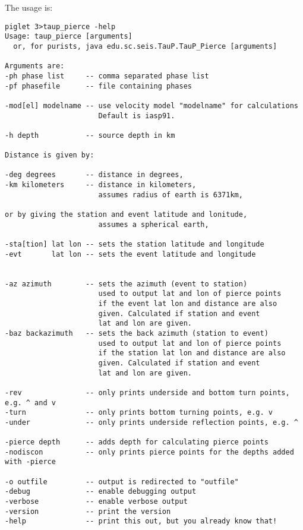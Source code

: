 The usage is:
\begin{verbatim}
piglet 3>taup_pierce -help
Usage: taup_pierce [arguments]
  or, for purists, java edu.sc.seis.TauP.TauP_Pierce [arguments]

Arguments are:
-ph phase list     -- comma separated phase list
-pf phasefile      -- file containing phases

-mod[el] modelname -- use velocity model "modelname" for calculations
                      Default is iasp91.

-h depth           -- source depth in km

Distance is given by:

-deg degrees       -- distance in degrees,
-km kilometers     -- distance in kilometers,
                      assumes radius of earth is 6371km,

or by giving the station and event latitude and lonitude,
                      assumes a spherical earth,

-sta[tion] lat lon -- sets the station latitude and longitude
-evt       lat lon -- sets the event latitude and longitude


-az azimuth        -- sets the azimuth (event to station)
                      used to output lat and lon of pierce points
                      if the event lat lon and distance are also
                      given. Calculated if station and event
                      lat and lon are given.
-baz backazimuth   -- sets the back azimuth (station to event)
                      used to output lat and lon of pierce points
                      if the station lat lon and distance are also
                      given. Calculated if station and event
                      lat and lon are given.

-rev               -- only prints underside and bottom turn points, e.g. ^ and v
-turn              -- only prints bottom turning points, e.g. v
-under             -- only prints underside reflection points, e.g. ^

-pierce depth      -- adds depth for calculating pierce points
-nodiscon          -- only prints pierce points for the depths added with -pierce

-o outfile         -- output is redirected to "outfile"
-debug             -- enable debugging output
-verbose           -- enable verbose output
-version           -- print the version
-help              -- print this out, but you already know that!
\end{verbatim} 
 
